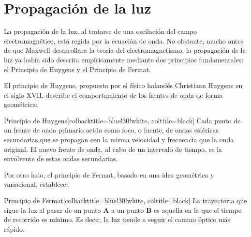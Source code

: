 %

\section*{Propagación de la luz}

La propagación de la luz, al tratarse de una oscilación del campo electromagnético, está regida por la ecuación de onda. No obstante, mucho antes de que Maxwell desarrollara la teoría del electromagnetismo, la propagación de la luz ya había sido descrita empíricamente mediante dos principios fundamentales: el Principio de Huygens y el Principio de Fermat.

El principio de Huygens, propuesto por el físico holandés Christiaan Huygens en el siglo XVII, describe el comportamiento de los frentes de onda de forma geométrica:

\begin{mybox}[green]{Principio de Huygens}[colbacktitle=blue!30!white, coltitle=black]
	Cada punto de un frente de onda primario actúa como foco, o fuente, de ondas esféricas secundarias que se propagan con la misma velocidad y frecuencia que la onda original. El nuevo frente de onda, al cabo de un intervalo de tiempo, es la envolvente de estas ondas secundarias.
\end{mybox}

Por otro lado, el principio de Fermat, basado en una idea geométrica y variacional, establece:

\begin{mybox}[green]{Principio de Fermat}[colbacktitle=blue!30!white, coltitle=black]
	La trayectoria que sigue la luz al pasar de un punto \textbf{A} a un punto \textbf{B} es aquella en la que el tiempo de recorrido es mínimo. Es decir, la luz tiende a seguir el camino óptico más rápido.
\end{mybox}

\vspace{0.3cm}

